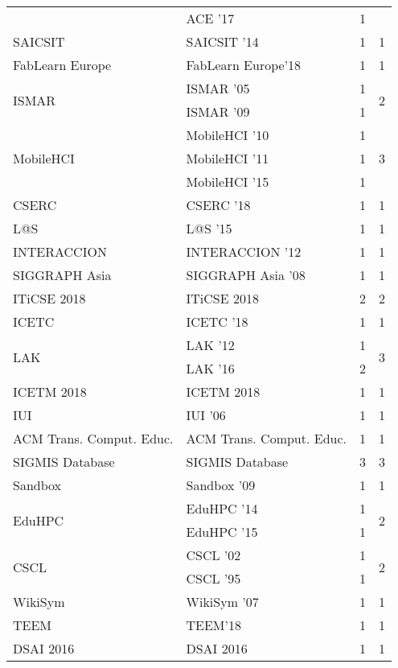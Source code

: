 \begin{table*}[t]
\begin{tabular}{llrr}
& ACE '17 & 1 &\\
\multirow{1}{*}{SAICSIT } & SAICSIT '14 & 1 & \multirow{1}{*}{1}\\
\multirow{1}{*}{FabLearn Europe} & FabLearn Europe'18 & 1 & \multirow{1}{*}{1}\\
\multirow{2}{*}{ISMAR } & ISMAR '05 & 1 & \multirow{2}{*}{2}\\
& ISMAR '09 & 1 &\\
\multirow{3}{*}{MobileHCI } & MobileHCI '10 & 1 & \multirow{3}{*}{3}\\
& MobileHCI '11 & 1 &\\
& MobileHCI '15 & 1 &\\
\multirow{1}{*}{CSERC } & CSERC '18 & 1 & \multirow{1}{*}{1}\\
\multirow{1}{*}{L@S } & L@S '15 & 1 & \multirow{1}{*}{1}\\
\multirow{1}{*}{INTERACCION } & INTERACCION '12 & 1 & \multirow{1}{*}{1}\\
\multirow{1}{*}{SIGGRAPH Asia } & SIGGRAPH Asia '08 & 1 & \multirow{1}{*}{1}\\
\multirow{1}{*}{ITiCSE 2018} & ITiCSE 2018 & 2 & \multirow{1}{*}{2}\\
\multirow{1}{*}{ICETC } & ICETC '18 & 1 & \multirow{1}{*}{1}\\
\multirow{2}{*}{LAK } & LAK '12 & 1 & \multirow{2}{*}{3}\\
& LAK '16 & 2 &\\
\multirow{1}{*}{ICETM 2018} & ICETM 2018 & 1 & \multirow{1}{*}{1}\\
\multirow{1}{*}{IUI } & IUI '06 & 1 & \multirow{1}{*}{1}\\
\multirow{1}{*}{ACM Trans. Comput. Educ.} & ACM Trans. Comput. Educ. & 1 & \multirow{1}{*}{1}\\
\multirow{1}{*}{SIGMIS Database} & SIGMIS Database & 3 & \multirow{1}{*}{3}\\
\multirow{1}{*}{Sandbox } & Sandbox '09 & 1 & \multirow{1}{*}{1}\\
\multirow{2}{*}{EduHPC } & EduHPC '14 & 1 & \multirow{2}{*}{2}\\
& EduHPC '15 & 1 &\\
\multirow{2}{*}{CSCL } & CSCL '02 & 1 & \multirow{2}{*}{2}\\
& CSCL '95 & 1 &\\
\multirow{1}{*}{WikiSym } & WikiSym '07 & 1 & \multirow{1}{*}{1}\\
\multirow{1}{*}{TEEM} & TEEM'18 & 1 & \multirow{1}{*}{1}\\
\multirow{1}{*}{DSAI 2016} & DSAI 2016 & 1 & \multirow{1}{*}{1}\\

\end{tabular}
\end{table*}
